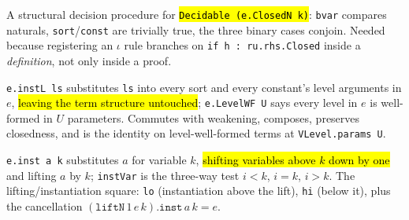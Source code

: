 \begin{definition}
\label{inst:dec-closedn}
\leanok
{} 

 A structural decision procedure for \hl{\texttt{Decidable (e.ClosedN k)}}:
\texttt{bvar} compares naturals, \texttt{sort}/\texttt{const} are trivially true, the three
binary cases conjoin.
 Needed because registering an $\iota$ rule branches on
\texttt{if h : ru.rhs.Closed} inside a \emph{definition}, not only inside a proof.
\end{definition}

\begin{definition}
\label{def:instl}
\leanok
{}

 \texttt{e.instL ls} substitutes \texttt{ls} into every sort and every
constant's level arguments in $e$, \hl{leaving the term structure untouched};
\texttt{e.LevelWF U} says every level in $e$ is well-formed in $U$ parameters.
Commutes with weakening, composes, preserves closedness, and is the identity on
level-well-formed terms at \texttt{VLevel.params U}.
\end{definition}

\begin{definition}
\label{def:inst}
\leanok
{}

 \texttt{e.inst a k} substitutes $a$ for variable $k$, \hl{shifting
variables above $k$ down by one} and lifting $a$ by $k$; \texttt{instVar} is the
three-way test $i<k$, $i=k$, $i>k$.
The lifting/instantiation square: \texttt{lo} (instantiation above the lift),
\texttt{hi} (below it), plus the cancellation
$(\texttt{liftN}\,1\,e\,k).\texttt{inst}\,a\,k = e$.
\end{definition}

